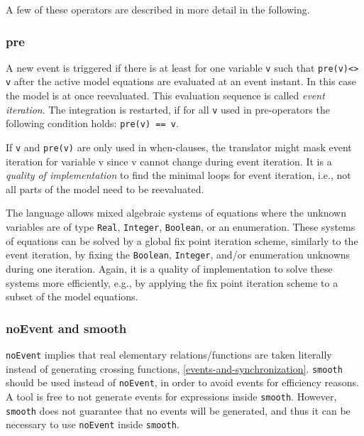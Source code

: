 A few of these operators are described in more detail in the following.

\subsubsection{pre}

A new event is triggered if there is at least for one variable \lstinline!v! such that \lstinline!pre(v)<> v! after the active model equations are
evaluated at an event instant. In this case the model is at once
reevaluated. This evaluation sequence is called \emph{event
iteration}. The integration is restarted, if for all \lstinline!v! used in
pre-operators the following condition holds: \lstinline!pre(v) == v!.

\begin{nonnormative}
If \lstinline!v! and \lstinline!pre(v)! are only used in when-clauses,
the translator might mask event iteration for variable v since v cannot
change during event iteration. It is a \emph{quality of implementation} to
find the minimal loops for event iteration, i.e., not all parts of the
model need to be reevaluated.

The language allows mixed algebraic systems of equations where the
unknown variables are of type \lstinline!Real!, \lstinline!Integer!, \lstinline!Boolean!, or an enumeration.
These systems of equations can be solved by a global fix point iteration
scheme, similarly to the event iteration, by fixing the \lstinline!Boolean!,
\lstinline!Integer!, and/or enumeration unknowns during one iteration. Again, it is
a quality of implementation to solve these systems more efficiently,
e.g., by applying the fix point iteration scheme to a subset of the
model equations.
\end{nonnormative}

\subsubsection{noEvent and smooth}

\lstinline!noEvent! implies that real elementary relations/functions
are taken literally instead of generating crossing functions, \autoref{events-and-synchronization}.
\lstinline!smooth! should be used instead of \lstinline!noEvent!, in order to
avoid events for efficiency reasons. A tool is free to not generate
events for expressions inside \lstinline!smooth!. However, \lstinline!smooth! does not guarantee
that no events will be generated, and thus it can be necessary to use
\lstinline!noEvent! inside \lstinline!smooth!.

